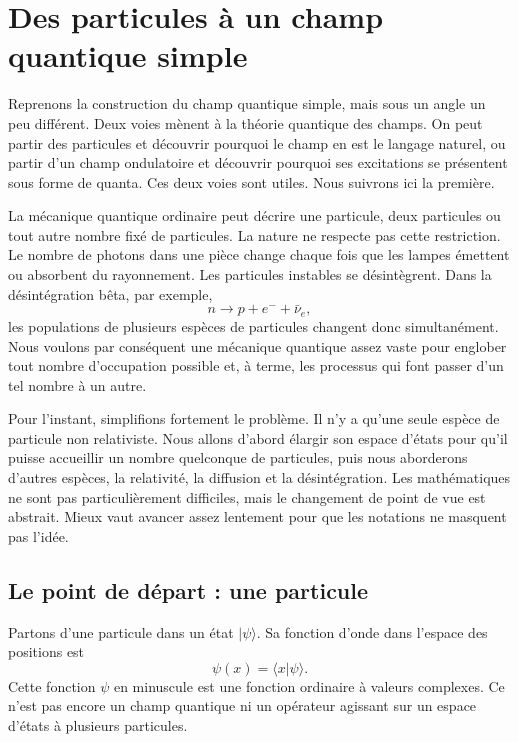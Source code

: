 \chapter{Des particules à un champ quantique simple}

Reprenons la construction du champ quantique simple, mais sous un angle un peu différent. Deux voies mènent à la théorie quantique des champs. On peut partir des particules et découvrir pourquoi le champ en est le langage naturel, ou partir d’un champ ondulatoire et découvrir pourquoi ses excitations se présentent sous forme de quanta. Ces deux voies sont utiles. Nous suivrons ici la première.

La mécanique quantique ordinaire peut décrire une particule, deux particules ou tout autre nombre fixé de particules. La nature ne respecte pas cette restriction. Le nombre de photons dans une pièce change chaque fois que les lampes émettent ou absorbent du rayonnement. Les particules instables se désintègrent. Dans la désintégration bêta, par exemple,
\begin{equation}
n\longrightarrow p+e^-+\bar{\nu}_e,
\end{equation}
les populations de plusieurs espèces de particules changent donc simultanément. Nous voulons par conséquent une mécanique quantique assez vaste pour englober tout nombre d’occupation possible et, à terme, les processus qui font passer d’un tel nombre à un autre.

Pour l’instant, simplifions fortement le problème. Il n’y a qu’une seule espèce de particule non relativiste. Nous allons d’abord élargir son espace d’états pour qu’il puisse accueillir un nombre quelconque de particules, puis nous aborderons d’autres espèces, la relativité, la diffusion et la désintégration. Les mathématiques ne sont pas particulièrement difficiles, mais le changement de point de vue est abstrait. Mieux vaut avancer assez lentement pour que les notations ne masquent pas l’idée.

\section{Le point de départ : une particule}

Partons d’une particule dans un état \(|\psi\rangle\). Sa fonction d’onde dans l’espace des positions est
\begin{equation}
\psi(x)=\langle x|\psi\rangle.
\label{eq:l07-wavefunction}
\end{equation}
Cette fonction \(\psi\) en minuscule est une fonction ordinaire à valeurs complexes. Ce n’est pas encore un champ quantique ni un opérateur agissant sur un espace d’états à plusieurs particules.

